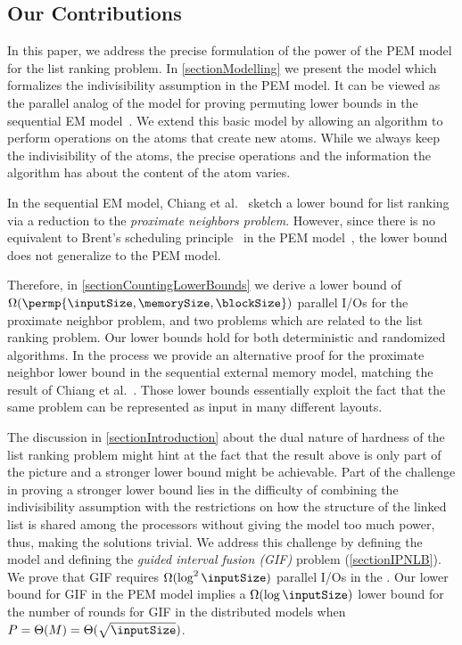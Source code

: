 \documentclass[envcountsame]{llncs}
\begin{document}
\subsection{Our Contributions}
\label{sectionContributions}


In this paper, we address the precise formulation of the power of the PEM model for the list ranking problem.
In \autoref{sectionModelling} we present the \movePEM model which formalizes the indivisibility assumption in the PEM model.
It can be viewed as the parallel analog of the model for proving permuting lower bounds in the sequential EM model~\cite{1988AggarwalVitterEM}. 
We extend this basic model by allowing an algorithm to perform operations on the atoms that create new atoms. 
While we always keep the indivisibility of the atoms, the precise operations and the information the algorithm has about the content of the atom varies.


In the sequential EM model, Chiang et al.~\cite{1995ChiangExternalMemoryGraphAlgorithms} sketch a lower bound for list ranking via a reduction to the {\em proximate neighbors problem}.
However, since there is no equivalent to Brent's scheduling principle~\cite{1984VishkinRandomizedLR} in the PEM model~\cite{2012ThesisGero}, the lower bound does not generalize to the PEM model.

Therefore, in \autoref{sectionCountingLowerBounds} we derive a lower bound of $\Omega(\permp{\inputSize, \memorySize, \blockSize})$ parallel I/Os for the proximate neighbor problem, and two problems which are related to the list ranking problem. Our lower bounds hold for both deterministic and randomized algorithms.
In the process we provide an alternative proof for the proximate neighbor lower bound in the sequential external memory model, matching the result of Chiang et al.~\cite{1995ChiangExternalMemoryGraphAlgorithms}.
Those lower bounds essentially exploit the fact that the same problem can be represented as input in many different layouts.



The discussion in \autoref{sectionIntroduction} about the dual nature of hardness of the list ranking problem might hint at the fact that the result above is only part of the picture and a stronger lower bound might be achievable. 
Part of the challenge in proving a stronger lower bound lies in the difficulty of combining the indivisibility assumption with the restrictions on how the structure of the linked list is shared among the processors without giving the model too much power, thus, making the solutions trivial. 
We address this challenge by defining the \emph{\fusePEM} model and defining the {\em guided interval fusion (GIF)} problem (\autoref{sectionIPNLB}).
We prove that GIF requires $\Omega(\log^2 \inputSize)$ parallel I/Os in the \fusePEM. Our lower bound for GIF in the PEM model implies a $\Omega(\log \inputSize)$ lower bound for the number of rounds for GIF in the distributed models when $P = \Theta(M) = \Theta(\sqrt{\inputSize})$. 
\end{document}
